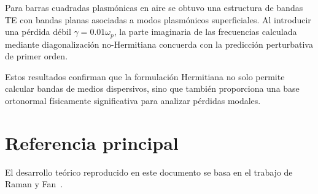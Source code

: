 \documentclass[11pt,a4paper]{article}
\newcommand{\omegap}{\omega_p}
\begin{document}
Para barras cuadradas plasmónicas en aire se obtuvo una estructura de bandas TE
con bandas planas asociadas a modos plasmónicos superficiales. Al introducir
una pérdida débil $\gamma=0.01\omegap$, la parte imaginaria de las frecuencias
calculada mediante diagonalización no-Hermitiana concuerda con la predicción
perturbativa de primer orden.

Estos resultados confirman que la formulación Hermitiana no solo permite
calcular bandas de medios dispersivos, sino que también proporciona una base
ortonormal físicamente significativa para analizar pérdidas modales.

\section*{Referencia principal}

El desarrollo teórico reproducido en este documento se basa en el trabajo de
Raman y Fan~\cite{Raman2010}.



\end{document}
